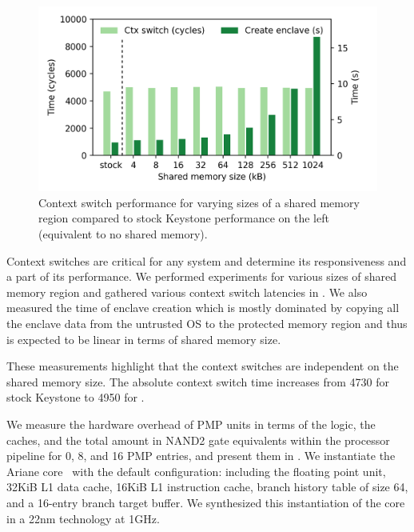 \begin{figure}[t]
    \centering
    \includegraphics[width=\linewidth]{chapters/PIE/images/graphs/ctxswitch.png}
    \vspace{-3em}
    \caption[Context switch performance]{Context switch performance for varying sizes of a shared memory region compared to stock Keystone performance on the left (equivalent to no shared memory).}
    \label{fig:ctxswitches}
\end{figure}

Context switches are critical for any system and determine its responsiveness and a part of its performance.
We performed experiments for various sizes of shared memory region and gathered various context switch latencies in . We also measured the time of enclave creation which is mostly dominated by copying all the enclave data from the untrusted OS to the protected memory region and thus is expected to be linear in terms of shared memory size. 

These measurements highlight that the context switches are independent on the shared memory size. The absolute context switch time increases from 4730 for stock Keystone to 4950 for \name{}.

We measure the hardware overhead of PMP units in terms of the logic, the caches, and the total amount in NAND2 gate equivalents within the processor pipeline for 0, 8, and 16 PMP entries, and present them in . We instantiate the Ariane core~\cite{ariane} with the default configuration: including the floating point unit, 32KiB L1 data cache, 16KiB L1 instruction cache, branch history table of size 64, and a 16-entry branch target buffer. We synthesized this instantiation of the core in a 22nm technology at 1GHz. %


